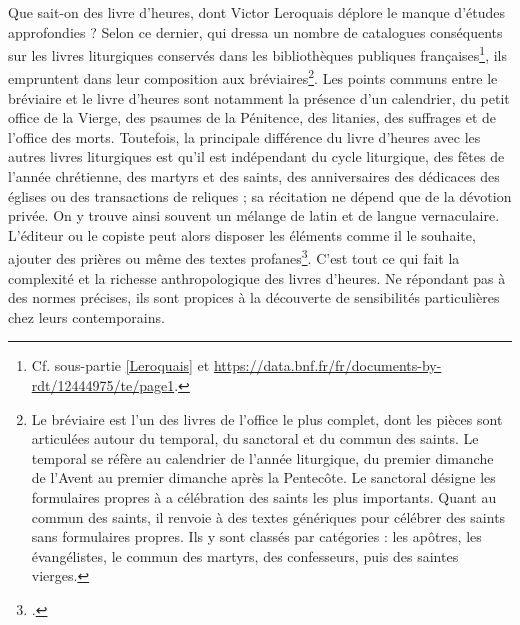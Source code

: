 \documentclass[a4paper,12pt,twoside]{book}
\begin{document}
Que sait-on des livre d'heures, dont Victor Leroquais déplore le manque d'études approfondies ? Selon ce dernier, qui dressa un nombre de catalogues conséquents sur les livres liturgiques conservés dans les bibliothèques publiques françaises\footnote{Cf. sous-partie \ref{Leroquais} et \url{https://data.bnf.fr/fr/documents-by-rdt/12444975/te/page1}.}, ils empruntent dans leur composition aux bréviaires\footnote{Le bréviaire est l'un des livres de l'office le plus complet, dont les pièces sont articulées autour du temporal, du sanctoral et du commun des saints. Le temporal se réfère au calendrier de l'année liturgique, du premier dimanche de l'Avent au premier dimanche après la Pentecôte. Le sanctoral désigne les formulaires propres à a célébration des saints les plus importants. Quant au commun des saints, il renvoie à des textes génériques pour célébrer des saints sans formulaires propres. Ils y sont classés par catégories : les apôtres, les évangélistes, le commun des martyrs, des confesseurs, puis des saintes vierges.}. Les points communs entre le bréviaire et le livre d'heures sont notamment la présence d'un calendrier, du petit office de la Vierge, des psaumes de la Pénitence, des litanies, des suffrages et de l'office des morts. Toutefois, la principale différence du livre d'heures avec les autres livres liturgiques est qu'il est indépendant du cycle liturgique, des fêtes de l'année chrétienne, des martyrs et des saints, des anniversaires des dédicaces des églises ou des transactions de reliques ; sa récitation ne dépend que de la dévotion privée. On y trouve ainsi souvent un mélange de latin et de langue vernaculaire. L'éditeur ou le copiste peut alors disposer les éléments comme il le souhaite, ajouter des prières ou même des textes profanes\footcite[p. VI]{Leroquais_notices}. C'est tout ce qui fait la complexité et la richesse anthropologique des livres d'heures. Ne répondant pas à des normes précises, ils sont propices à la découverte de sensibilités particulières chez leurs contemporains. 
\end{document}
